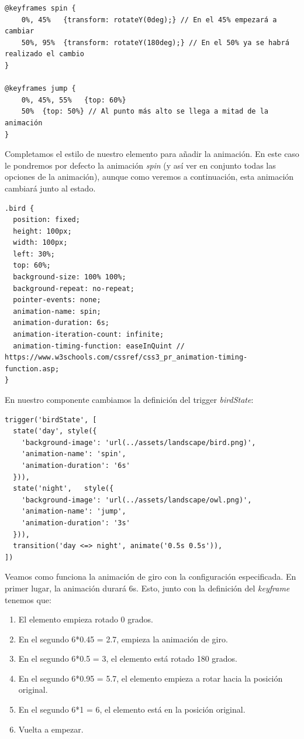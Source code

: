 {\begin{lstlisting}[style=htmlcssjs,frame=tlrb, xleftmargin={0.2cm}]
@keyframes spin {
    0%, 45%   {transform: rotateY(0deg);} // En el 45% empezará a cambiar
    50%, 95%  {transform: rotateY(180deg);} // En el 50% ya se habrá realizado el cambio
}

@keyframes jump {
    0%, 45%, 55%   {top: 60%}
    50%  {top: 50%} // Al punto más alto se llega a mitad de la animación
}
\end{lstlisting}}

Completamos el estilo de nuestro elemento para añadir la animación. En este caso le pondremos por defecto la animación \emph{spin} (y así ver en conjunto todas las opciones de la animación), aunque como veremos a continuación, esta animación cambiará junto al estado.

{\begin{lstlisting}[style=htmlcssjs,frame=tlrb, xleftmargin={0.2cm}]
.bird {
  position: fixed;
  height: 100px;
  width: 100px;
  left: 30%;
  top: 60%;
  background-size: 100% 100%;
  background-repeat: no-repeat;
  pointer-events: none;
  animation-name: spin;
  animation-duration: 6s;
  animation-iteration-count: infinite;
  animation-timing-function: easeInQuint // https://www.w3schools.com/cssref/css3_pr_animation-timing-function.asp;
}
\end{lstlisting}}

En nuestro componente cambiamos la definición del trigger \emph{birdState}:

{\begin{lstlisting}[style=htmlcssjs,frame=tlrb, xleftmargin={0.2cm}]
trigger('birdState', [
  state('day', style({
    'background-image': 'url(../assets/landscape/bird.png)',
    'animation-name': 'spin',
    'animation-duration': '6s'
  })),
  state('night',   style({
    'background-image': 'url(../assets/landscape/owl.png)',
    'animation-name': 'jump',
    'animation-duration': '3s'
  })),
  transition('day <=> night', animate('0.5s 0.5s')),
])
\end{lstlisting}}

Veamos como funciona la animación de giro con la configuración especificada. En primer lugar, la animación durará 6s. Esto, junto con la definición del \emph{keyframe} tenemos que:

\begin{enumerate}
  \item El elemento empieza rotado 0 grados.
  \item En el segundo 6*0.45 = 2.7, empieza la animación de giro.
  \item En el segundo 6*0.5 = 3, el elemento está rotado 180 grados.
  \item En el segundo 6*0.95 = 5.7, el elemento empieza a rotar hacia la posición original.
  \item En el segundo 6*1 = 6, el elemento está en la posición original.
  \item Vuelta a empezar.
\end{enumerate}

